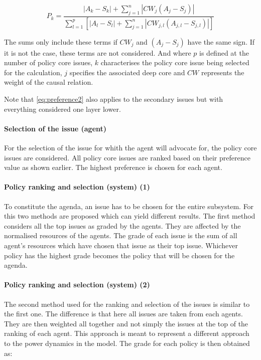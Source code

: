 \begin{equation}\label{eq:preference2}
P_k= \frac{ |A_k - S_k| + \sum_{j=1}^n |CW_j \left( A_j - S_j \right)|}{\sum_{l=1}^p \left[ |A_l - S_l| + \sum_{j=1}^n \left|CW_{j,l} \left( A_{j,l} - S_{j,l} \right) \right| \right]}
\end{equation}

The sums only include these terms if $CW_j$ and $\left( A_j - S_j \right)$ have the same sign. If it is not the case, these terms are not considered. And where $p$ is defined at the number of policy core issues, $k$ characterises the policy core issue being selected for the calculation, $j$ specifies the associated deep core and $CW$ represents the weight of the causal relation.

Note that \autoref{eq:preference2} also applies to the secondary issues but with everything considered one layer lower.


\paragraph{Selection of the issue (agent)}

For the selection of the issue for whith the agent will advocate for, the policy core issues are considered. All policy core issues are ranked based on their preference value as shown earlier. The highest preference is chosen for each agent.

\paragraph{Policy ranking and selection (system) (1)}

To constitute the agenda, an issue has to be chosen for the entire subsystem. For this two methods are proposed which can yield different results. The first method considers all the top issues as graded by the agents. They are affected by the normalised resources of the agents. The grade of each issue is the sum of all agent's resources which have chosen that issue as their top issue. Whichever policy has the highest grade becomes the policy that will be chosen for the agenda.

\paragraph{Policy ranking and selection (system) (2)}

The second method used for the ranking and selection of the issues is similar to the first one. The difference is that here all issues are taken from each agents. They are then weighted all together and not simply the issues at the top of the ranking of each agent. This approach is meant to represent a different approach to the power dynamics in the model. The grade for each policy is then obtained as:

